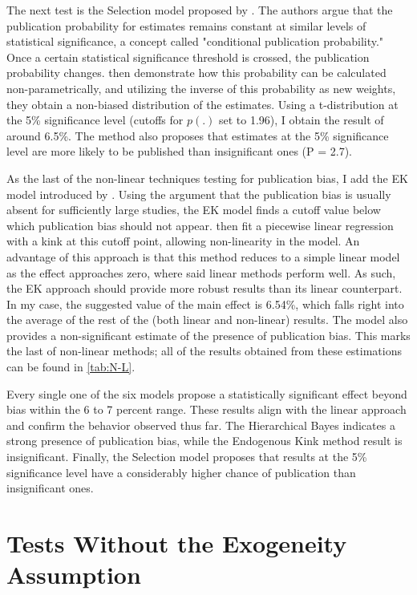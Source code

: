 The next test is the Selection model proposed by \cite{Andrews2019Selection}. The authors argue that the publication probability for estimates remains constant at similar levels of statistical significance, a concept called "conditional publication probability." Once a certain statistical significance threshold is crossed, the publication probability changes. \cite{Andrews2019Selection} then demonstrate how this probability can be calculated non-parametrically, and utilizing the inverse of this probability as new weights, they obtain a non-biased distribution of the estimates. Using a t-distribution at the 5\% significance level (cutoffs for $p(.)$ set to 1.96), I obtain the result of around 6.5\%. The method also proposes that estimates at the 5\% significance level are more likely to be published than insignificant ones (P = 2.7).

As the last of the non-linear techniques testing for publication bias, I add the \ac{EK} model introduced by \cite{Bom2019Kink}. Using the argument that the publication bias is usually absent for sufficiently large studies, the \ac{EK} model finds a cutoff value below which publication bias should not appear. \cite{Bom2019Kink} then fit a piecewise linear regression with a kink at this cutoff point, allowing non-linearity in the model. An advantage of this approach is that this method reduces to a simple linear model as the effect approaches zero, where said linear methods perform well. As such, the \ac{EK} approach should provide more robust results than its linear counterpart. In my case, the suggested value of the main effect is 6.54\%, which falls right into the average of the rest of the (both linear and non-linear) results. The model also provides a non-significant estimate of the presence of publication bias. This marks the last of non-linear methods; all of the results obtained from these estimations can be found in \autoref{tab:N-L}.

Every single one of the six models propose a statistically significant effect beyond bias within the 6 to 7 percent range. These results align with the linear approach and confirm the behavior observed thus far. The Hierarchical Bayes indicates a strong presence of publication bias, while the Endogenous Kink method result is insignificant. Finally, the Selection model proposes that results at the 5\% significance level have a considerably higher chance of publication than insignificant ones.


\section{Tests Without the Exogeneity Assumption}
\label{sec:exo_tests}

